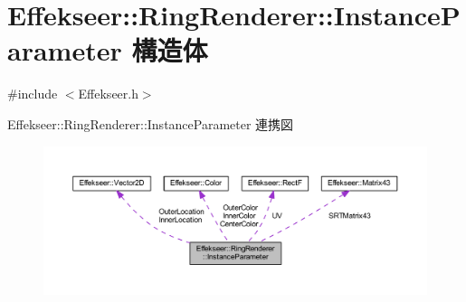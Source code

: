 \hypertarget{struct_effekseer_1_1_ring_renderer_1_1_instance_parameter}{}\section{Effekseer\+:\+:Ring\+Renderer\+:\+:Instance\+Parameter 構造体}
\label{struct_effekseer_1_1_ring_renderer_1_1_instance_parameter}


{\ttfamily \#include $<$Effekseer.\+h$>$}



Effekseer\+:\+:Ring\+Renderer\+:\+:Instance\+Parameter 連携図\nopagebreak
\begin{figure}[H]
\begin{center}
\leavevmode
\includegraphics[width=350pt]{struct_effekseer_1_1_ring_renderer_1_1_instance_parameter__coll__graph}
\end{center}
\end{figure}
